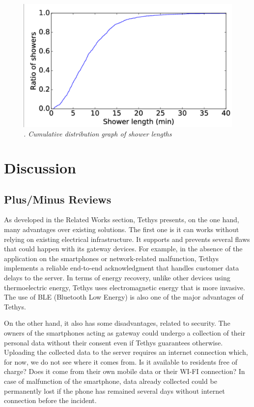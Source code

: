 \documentclass[10pt,journal,compsoc]{IEEEtran}
\begin{document}
\begin{center}
    \begin{figure}[!t]
        \includegraphics[scale=0.4]{distribution-shower-length.png}
        \caption{\label{étiquette5} \emph{. Cumulative distribution graph of shower lengths} \cite{IEEEhowto:}}
    \end{figure}

\end{center}

\section{Discussion}\label{sec:discussion}
\subsection{Plus/Minus Reviews}
As developed in the Related Works section, Tethys presents, on the one hand, many advantages over existing solutions. The first one is it can works without relying on existing electrical infrastructure. It supports and prevents several flaws that could happen with its gateway devices. For example, in the absence of the application on the smartphones or network-related malfunction, Tethys implements a reliable end-to-end acknowledgment that handles customer data delays to the server.
In terms of energy recovery, unlike other devices using thermoelectric energy, Tethys uses electromagnetic energy that is more invasive.
The use of BLE (Bluetooth Low Energy) is also one of the major advantages of Tethys.

On the other hand, it also has some disadvantages, related to security. The owners of the smartphones acting as gateway could undergo a collection of their personal data without their consent even if Tethys guarantees otherwise. Uploading the collected data to the server requires an internet connection which, for now, we do not see where it comes from. Is it available to residents free of charge? Does it come from their own mobile data or their WI-FI connection?
In case of malfunction of the smartphone, data already collected could be permanently lost if the phone has remained several days without internet connection before the incident.
\end{document}
